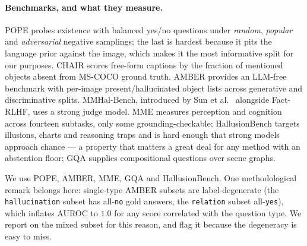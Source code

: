 \documentclass[review,number,doubleblind]{elsarticle}
\theoremstyle{plain}
\theoremstyle{definition}
\theoremstyle{remark}
\begin{document}
\paragraph{Benchmarks, and what they measure.}
POPE \citep{pope} probes existence with balanced yes/no questions under \emph{random},
\emph{popular} and \emph{adversarial} negative samplings; the last is hardest because it pits
the language prior against the image, which makes it the most informative split for our
purposes. CHAIR \citep{chair} scores free-form captions by the fraction of mentioned objects
absent from MS-COCO ground truth. AMBER \citep{amber} provides an LLM-free benchmark with
per-image present/hallucinated object lists across generative and discriminative splits.
MMHal-Bench, introduced by Sun et al.~\cite{sun2024aligning} alongside Fact-RLHF, uses a strong judge
model. MME \citep{mme} measures perception and cognition across fourteen subtasks, only some
grounding-checkable; HallusionBench \citep{hallusionbench} targets illusions, charts and
reasoning traps and is hard enough that strong models approach chance --- a property that
matters a great deal for any method with an abstention floor; GQA \citep{gqa} supplies
compositional questions over scene graphs.

We use POPE, AMBER, MME, GQA and HallusionBench. One methodological remark belongs here:
single-type AMBER subsets are label-degenerate (the \texttt{hallucination} subset has
all-\texttt{no} gold answers, the \texttt{relation} subset all-\texttt{yes}), which inflates
AUROC to $1.0$ for any score correlated with the question type. We report on the mixed subset
for this reason, and flag it because the degeneracy is easy to miss.
\end{document}

